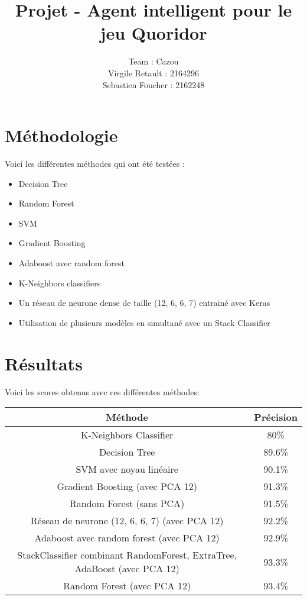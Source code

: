 \documentclass[12pt]{article}
\title{Projet - Agent intelligent pour le jeu Quoridor}
\author{
  Team : Cazou\\
  Virgile Retault : 2164296\\
  Sebastien Foucher : 2162248
}
\begin{document}
\maketitle

\section*{Méthodologie}
\newpage
Voici les différentes méthodes qui ont été testées :

\begin{itemize}
	\item Decision Tree
	\item Random Forest
	\item SVM
	\item Gradient Boosting
	\item Adaboost avec random forest
	\item K-Neighbors classifiers
	\item Un réseau de neurone dense de taille (12, 6, 6, 7) entrainé avec Keras
	\item Utilisation de plusieurs modèles en simultané avec un Stack Classifier
	
\end{itemize}


\section*{Résultats}

Voici les scores obtenus avec ces différentes méthodes:
\begin{center}
	\begin{tabular}{ |c|c| }
		\hline
		Méthode & Précision \\\hline\hline
	  K-Neighbors Classifier & 80\% \\\hline
		Decision Tree & 89.6\% \\\hline
		SVM avec noyau linéaire & 90.1\% \\\hline
		Gradient Boosting (avec PCA 12) & 91.3\% \\\hline
		Random Forest (sans PCA) & 91.5\% \\\hline
		Réseau de neurone (12, 6, 6, 7) (avec PCA 12) & 92.2\% \\\hline
		Adaboost avec random forest (avec PCA 12) & 92.9\% \\\hline
		StackClassifier combinant RandomForest, ExtraTree, AdaBoost (avec PCA 12) & 93.3\% \\\hline
		Random Forest (avec PCA 12) & 93.4\% \\\hline

	\end{tabular} 
\end{center}
\end{document}
